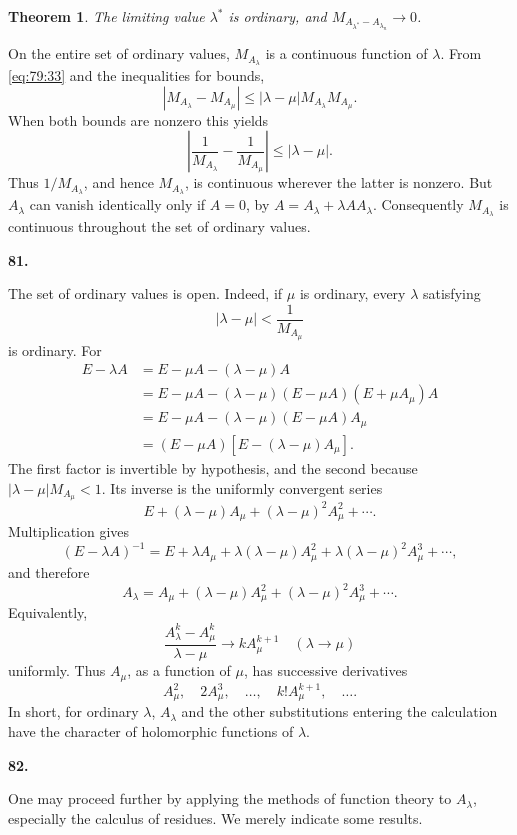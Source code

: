 \documentclass[
  paper=b5,
  fontsize=13pt,
  twoside=true,
  open=any,
  bookmarkpackage=false,
  chapterprefix=true,
  headings=normal
]{scrbook}
\newtheorem*{theorem}{Theorem}
\theoremstyle{definition}
\newcommand{\numberedparagraph}[1]{%
  \par\medskip\phantomsection\label{sec:#1}%
  \noindent\textbf{#1.}\enspace
}
\begin{document}
\begin{theorem}
The limiting value $\lambda^*$ is ordinary, and
$M_{A_{\lambda^*}-A_{\lambda_n}}\to0$.
\end{theorem}

On the entire set of ordinary values, $M_{A_\lambda}$ is a continuous
function of $\lambda$. From \eqref{eq:79:33} and the inequalities for
bounds,
\[
 |M_{A_\lambda}-M_{A_\mu}|
 \leq|\lambda-\mu|M_{A_\lambda}M_{A_\mu}.
\]
When both bounds are nonzero this yields
\[
 \left|\frac1{M_{A_\lambda}}-\frac1{M_{A_\mu}}\right|
 \leq|\lambda-\mu|.
\]
Thus $1/M_{A_\lambda}$, and hence $M_{A_\lambda}$, is continuous wherever
the latter is nonzero. But $A_\lambda$ can vanish identically only if
$A=0$, by $A=A_\lambda+\lambda AA_\lambda$. Consequently
$M_{A_\lambda}$ is continuous throughout the set of ordinary values.

\numberedparagraph{81}
The set of ordinary values is open. Indeed, if $\mu$ is ordinary, every
$\lambda$ satisfying
\[
  |\lambda-\mu|<\frac1{M_{A_\mu}}
\]
is ordinary.
For
\begin{align*}
 E-\lambda A
 &=E-\mu A-(\lambda-\mu)A\\
 &=E-\mu A-(\lambda-\mu)(E-\mu A)(E+\mu A_\mu)A\\
 &=E-\mu A-(\lambda-\mu)(E-\mu A)A_\mu\\
 &=(E-\mu A)[E-(\lambda-\mu)A_\mu].
\end{align*}
The first factor is invertible by hypothesis, and the second because
$|\lambda-\mu|M_{A_\mu}<1$. Its inverse is the uniformly convergent series
\[
 E+(\lambda-\mu)A_\mu+(\lambda-\mu)^2A_\mu^2+\cdots.
\]
Multiplication gives
\[
 (E-\lambda A)^{-1}
 =E+\lambda A_\mu
 +\lambda(\lambda-\mu)A_\mu^2
 +\lambda(\lambda-\mu)^2A_\mu^3+\cdots,
\]
and therefore
\[
 A_\lambda=A_\mu+(\lambda-\mu)A_\mu^2
 +(\lambda-\mu)^2A_\mu^3+\cdots.
\]
Equivalently,
\[
 \frac{A_\lambda^k-A_\mu^k}{\lambda-\mu}
 \longrightarrow kA_\mu^{k+1}
 \quad(\lambda\to\mu)
\]
uniformly. Thus $A_\mu$, as a function of $\mu$, has successive
derivatives
\[
 A_\mu^2,\quad 2A_\mu^3,\quad\ldots,\quad k!A_\mu^{k+1},\quad\ldots.
\]
In short, for ordinary $\lambda$, $A_\lambda$ and the other substitutions
entering the calculation have the character of holomorphic functions of
$\lambda$.

\numberedparagraph{82}
One may proceed further by applying the methods of function theory to
$A_\lambda$, especially the calculus of residues. We merely indicate some
results.
\end{document}
